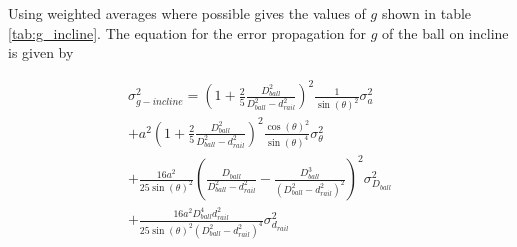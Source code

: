 \documentclass[a4paper,%
               aps,%
               prl,%
               amsfonts,%
               amssymb,%
               amsmath,%
               nobibnotes,%
               twocolumn, %
               twoside,%
               balancelastpage,%
               eqsecnum] %
               {revtex4-1}
\begin{document}
Using weighted averages where possible gives the values of $g$ shown in table \ref{tab:g_incline}.
The equation for the error propagation for $g$ of the ball on incline is given by

\begin{equation}
    \begin{split}
        \sigma_{g-incline}^2 = \left(1 + \frac{2}{5}\frac{D_{ball}^2}{D_{ball}^2 - d_{rail}^2} \right)^2 \frac{1}{\sin{(\theta)}^2}\sigma_a^2 \\
        + a^2 \left(1 + \frac{2}{5}\frac{D_{ball}^2}{D_{ball}^2-d_{rail}^2}\right)^2 \frac{\cos{(\theta)}^2}{\sin{(\theta)}^4} \sigma_{\theta}^2\\
        + \frac{16 a^2}{25 \sin{(\theta)}^2} \left( \frac{D_{ball}}{D_{ball}^2-d_{rail}^2} - \frac{D_{ball}^3}{( D_{ball}^2 - d_{rail}^2 )^2} \right)^2 \sigma_{D_{ball}}^2\\
        + \frac{16 a^2 D_{ball}^4 d_{rail}^2}{25\sin{(\theta)}^2 \left({D_{ball}^2 - d_{rail}^2}\right)^4} \sigma_{d_{rail}}^2
    \end{split}
\end{equation}
\end{document}
